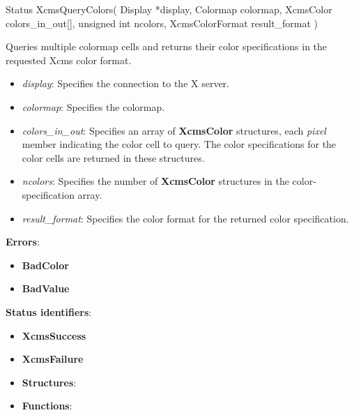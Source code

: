\documentclass{report}
\begin{document}
\begin{itemize}
            \begin{cppcode}
                Status XcmsQueryColors(
                    Display *display,
                    Colormap colormap,
                    XcmsColor colors_in_out[],
                    unsigned int ncolors,
                    XcmsColorFormat result_format
                )
            \end{cppcode}
            \bigbreak \noindent
            Queries multiple colormap cells and returns their color specifications in the requested Xcms color format.
            \begin{itemize}
                \item \textit{display}: Specifies the connection to the X server.
                \item \textit{colormap}: Specifies the colormap.
                \item \textit{colors\_in\_out}: Specifies an array of \textbf{XcmsColor} structures, each \textit{pixel} member indicating the color cell to query. The color specifications for the color cells are returned in these structures.
                \item \textit{ncolors}: Specifies the number of \textbf{XcmsColor} structures in the color-specification array.
                \item \textit{result\_format}: Specifies the color format for the returned color specification.
            \end{itemize}
            \bigbreak \noindent
            \textbf{Errors}:
            \begin{itemize}
                \item \textbf{BadColor}
                \item \textbf{BadValue}
            \end{itemize}
            \bigbreak \noindent
            \textbf{Status identifiers}:
            \begin{itemize}
                \item \textbf{XcmsSuccess}
                \item \textbf{XcmsFailure}
            \end{itemize}

    \end{itemize}

    \pagebreak 
    \begin{itemize}
        \item \textbf{Structures}:
        \item \textbf{Functions}:
    \end{itemize}
\end{document}
